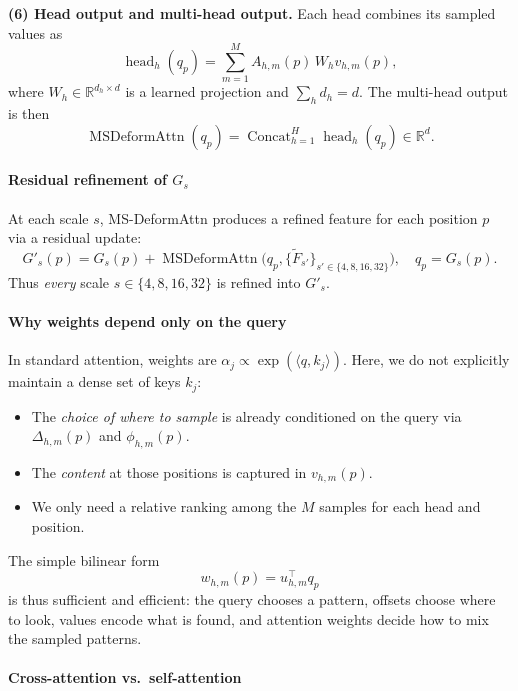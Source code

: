 \begin{enrichment}
\begin{enrichment}
		\textbf{(6) Head output and multi-head output.}  
		Each head combines its sampled values as
		\[
		\operatorname{head}_h(q_p)
		= \sum_{m=1}^M A_{h,m}(p)\, W_h v_{h,m}(p),
		\]
		where $W_h \in \mathbb{R}^{d_h \times d}$ is a learned projection and $\sum_h d_h = d$. The multi-head output is then
		\[
		\operatorname{MSDeformAttn}(q_p)
		= \operatorname{Concat}_{h=1}^H \operatorname{head}_h(q_p) \in \mathbb{R}^d.
		\]
		
		\paragraph{Residual refinement of $G_s$}
		At each scale $s$, MS-DeformAttn produces a refined feature for each position $p$ via a residual update:
		\begin{equation}
			G'_s(p)
			= G_s(p) + \operatorname{MSDeformAttn}\!\bigl(
			q_p, \{\tilde F_{s'}\}_{s' \in \{4,8,16,32\}}
			\bigr), \quad q_p = G_s(p).
			\label{eq:chapter15_maskdino_msdeform_update}
		\end{equation}
		Thus \emph{every} scale $s \in \{4,8,16,32\}$ is refined into $G'_s$.
		
		\paragraph{Why weights depend only on the query}
		In standard attention, weights are $\alpha_j \propto \exp(\langle q,k_j\rangle)$. Here, we do not explicitly maintain a dense set of keys $k_j$:
		\begin{itemize}
			\item The \emph{choice of where to sample} is already conditioned on the query via $\Delta_{h,m}(p)$ and $\phi_{h,m}(p)$.
			\item The \emph{content} at those positions is captured in $v_{h,m}(p)$.
			\item We only need a relative ranking among the $M$ samples for each head and position.
		\end{itemize}
		The simple bilinear form
		\[
		w_{h,m}(p) = u_{h,m}^\top q_p
		\]
		is thus sufficient and efficient: the query chooses a pattern, offsets choose where to look, values encode what is found, and attention weights decide how to mix the sampled patterns.
		
		\paragraph{Cross-attention vs.\ self-attention}
		

\end{enrichment}
\end{enrichment}
